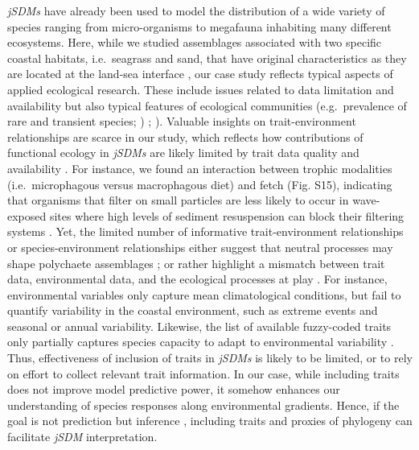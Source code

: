 \documentclass[9pt,biorxiv,doublespacing,lineno]{lapreprint}
\begin{document}
\emph{jSDMs} have already been used to model the distribution of a wide
variety of species ranging from micro-organisms \autocite{Minard_2019}
to megafauna \autocite{Brimacombe_2020} inhabiting many different
ecosystems. Here, while we studied assemblages associated with two
specific coastal habitats, i.e.~seagrass and sand, that have original
characteristics as they are located at the land-sea interface
\autocite{Boye_2019a}, our case study reflects typical aspects of
applied ecological research. These include issues related to data
limitation and availability but also typical features of ecological
communities (e.g.~prevalence of rare and transient species;
\textcite{Magurran_2003}) ; \textcite{SnellTaylor_2018}). Valuable
insights on trait-environment relationships are scarce in our study,
which reflects how contributions of functional ecology in \emph{jSDMs}
are likely limited by trait data quality and availability \autocites[
]{Tyler_2012}{deJuan_2022}. For instance, we found an interaction
between trophic modalities (i.e.~microphagous versus macrophagous diet)
and fetch (Fig. S15), indicating that organisms that filter on small
particles are less likely to occur in wave-exposed sites where high
levels of sediment resuspension can block their filtering systems
\autocite{Manning_2014}. Yet, the limited number of informative
trait-environment relationships or species-environment relationships
either suggest that neutral processes may shape polychaete assemblages
\autocite{Boye_2019a}; or rather highlight a mismatch between trait
data, environmental data, and the ecological processes at play
\autocite{deJuan_2022}. For instance, environmental variables only
capture mean climatological conditions, but fail to quantify variability
in the coastal environment, such as extreme events and seasonal or
annual variability. Likewise, the list of available fuzzy-coded traits
only partially captures species capacity to adapt to environmental
variability \autocite{deJuan_2022}. Thus, effectiveness of inclusion of
traits in \emph{jSDMs} is likely to be limited, or to rely on effort to
collect relevant trait information. In our case, while including traits
does not improve model predictive power, it somehow enhances our
understanding of species responses along environmental gradients. Hence,
if the goal is not prediction but inference \autocite{Tredennick_2021},
including traits and proxies of phylogeny can facilitate \emph{jSDM}
interpretation.
\end{document}
